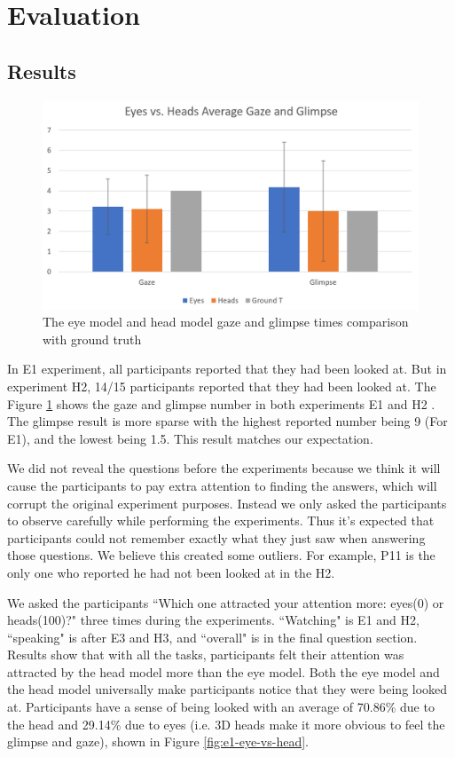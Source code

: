 \section{Evaluation}

\subsection{Results}

\begin{figure}
	\centering
 	\includegraphics[width=\textwidth]{Result_F1.png}
	\caption{The eye model and head model gaze and glimpse times comparison with ground truth}
	\label{fig:e1-ga}
\end{figure}

In E1 experiment, all participants reported that they had been looked at. But in experiment H2, 14/15 participants reported that they had been looked at. The Figure \ref{fig:e1-ga} shows the gaze and glimpse number in both experiments E1 and H2 . The glimpse result is more sparse with the highest reported number being 9 (For E1), and the lowest being 1.5. This result matches our expectation. 

We did not reveal the questions before the experiments because we think it will cause the participants to pay extra attention to finding the answers, which will corrupt the original experiment purposes. Instead we only asked the participants to observe carefully while performing the experiments. Thus it’s expected that participants could not remember exactly what they just saw when answering those questions. We believe this created some outliers. For example, P11 is the only one who reported he had not been looked at in the H2.

We asked the participants ``Which one attracted your attention more: eyes(0) or heads(100)?" three times during the experiments. ``Watching" is E1 and H2, ``speaking" is after E3 and H3, and ``overall" is in the final question section. Results show that with all the tasks, participants felt their attention was attracted by the head model more than the eye model. Both the eye model and the head model universally make participants notice that they were being looked at. Participants have a sense of being looked with an average of 70.86\% due to the head and 29.14\% due to eyes (i.e. 3D heads make it more obvious to feel the glimpse and gaze), shown in Figure \ref{fig:e1-eye-vs-head}. 

